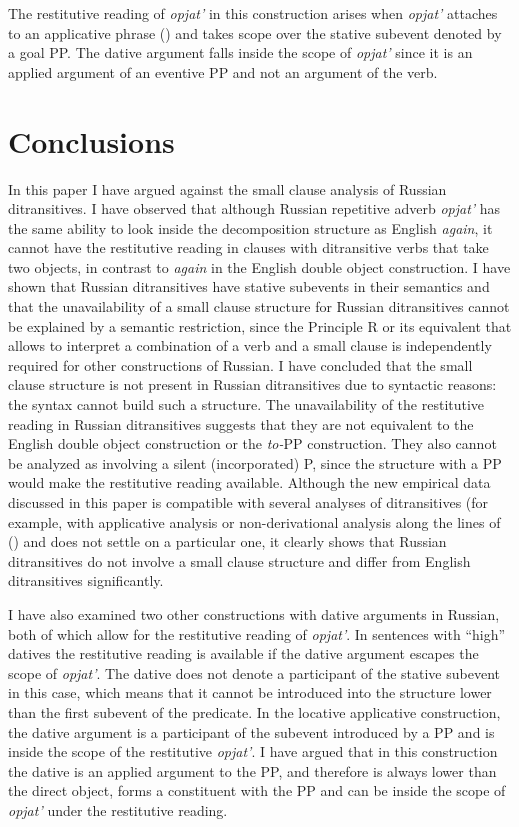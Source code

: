 \documentclass[output=paper]{langscibook}
\begin{document}
The restitutive reading of \textit{opjat’} in this construction arises when \textit{opjat’} attaches to an applicative phrase () and takes scope over the stative subevent denoted by a goal PP. The dative argument falls inside the scope of \textit{opjat’} since it is an applied argument of an eventive PP and not an argument of the verb.


\section{Conclusions}\label{s6}

In this paper I have argued against the small clause analysis of Russian ditransitives. I have observed that although Russian repetitive adverb \textit{opjat’} has the same ability to look inside the decomposition structure as English \textit{again}, it cannot have the restitutive reading in clauses with ditransitive verbs that take two objects, in contrast to \textit{again} in the English double object construction. I have shown that Russian ditransitives have stative subevents in their semantics and that the unavailability of a small clause structure for Russian ditransitives cannot be explained by a semantic restriction, since the Principle R or its equivalent that allows to interpret a combination of a verb and a small clause is independently required for other constructions of Russian. I have concluded that the small clause structure is not present in Russian ditransitives due to syntactic reasons: the syntax cannot build such a structure. The unavailability of the restitutive reading in Russian ditransitives suggests that they are not equivalent to the English double object construction or the \textit{to-}PP construction. They also cannot be analyzed as involving a silent (incorporated) P, since the structure with a PP would make the restitutive reading available. Although the new empirical data discussed in this paper is compatible with several analyses of ditransitives (for example, with applicative analysis \citep{Bruening2010} or non-derivational analysis along the lines of (\citealt{Boneh-Nash2017}) and does not settle on a particular one, it clearly shows that Russian ditransitives do not involve a small clause structure and differ from English ditransitives significantly.\largerpage



I have also examined two other constructions with dative arguments in Russian, both of which allow for the restitutive reading of \textit{opjat’}. In sentences with “high” datives the restitutive reading is available if the dative argument escapes the scope of \textit{opjat’}. The dative does not denote a participant of the stative subevent in this case, which means that it cannot be introduced into the structure lower than the first subevent of the predicate. In the locative applicative construction, the dative argument is a participant of the subevent introduced by a PP and is inside the scope of the restitutive \textit{opjat’}. I have argued that in this construction the dative is an applied argument to the PP, and therefore is always lower than the direct object, forms a constituent with the PP and can be inside the scope of \textit{opjat’} under the restitutive reading.
\end{document}
